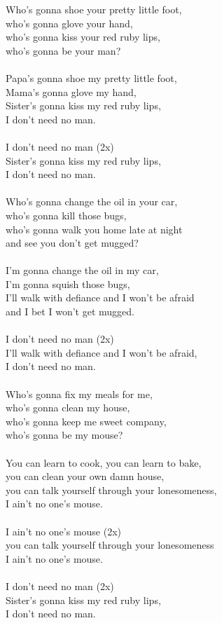 \documentclass[twoside,13pt,openany,letterpaper]{memoir}%
\begin{document}
Who's gonna shoe your pretty little foot,\\
who's gonna glove your hand,\\
who's gonna kiss your red ruby lips,\\
who's gonna be your man?\\
\\
Papa's gonna shoe my pretty little foot,\\
Mama's gonna glove my hand,\\
Sister's gonna kiss my red ruby lips,\\
I don't need no man.\\
\\
I don't need no man (2x)\\
Sister's gonna kiss my red ruby lips,\\
I don't need no man.\\
\\
Who's gonna change the oil in your car,\\
who's gonna kill those bugs,\\
who's gonna walk you home late at night\\
and see you don't get mugged?\\
\\
I'm gonna change the oil in my car,\\
I'm gonna squish those bugs,\\
I'll walk with defiance and I won't be afraid\\
and I bet I won't get mugged.\\
\\
I don't need no man (2x)\\
I'll walk with defiance and I won't be afraid,\\
I don't need no man.\\
\\
Who's gonna fix my meals for me,\\
who's gonna clean my house,\\
who's gonna keep me sweet company,\\
who's gonna be my mouse?\\
\\
You can learn to cook, you can learn to bake,\\
you can clean your own damn house,\\
you can talk yourself through your lonesomeness,\\
I ain't no one's mouse.\\
\\
I ain't no one's mouse (2x)\\
you can talk yourself through your lonesomeness\\
I ain't no one's mouse.\\
\\
I don't need no man (2x)\\
Sister's gonna kiss my red ruby lips,\\
I don't need no man.\\



\clearpage%
\printindex%
\end{document}

